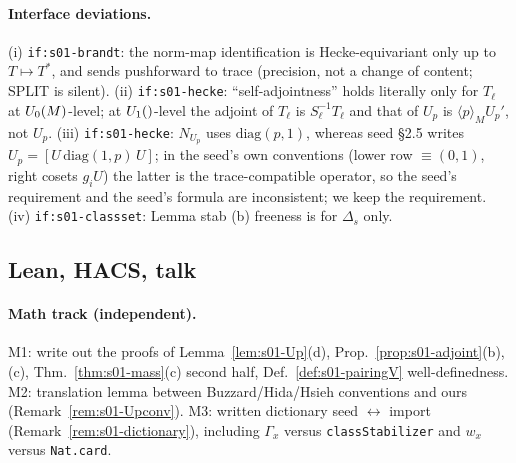 \paragraph{Interface deviations.}
(i) \texttt{if:s01-brandt}: the norm-map identification is Hecke-equivariant only up to $T\mapsto T^*$, and sends pushforward to
trace (precision, not a change of content; SPLIT is silent). (ii) \texttt{if:s01-hecke}: ``self-adjointness'' holds literally only for
$T_\ell$ at $U_0(M)$-level; at $U_1()$-level the adjoint of $T_\ell$ is $S_\ell^{-1}T_\ell$ and that of $U_p$ is
$\langle p\rangle_MU_p'$, not $U_p$. (iii) \texttt{if:s01-hecke}: $N_{U_p}$ uses $\mathrm{diag}(p,1)$, whereas seed \S2.5 writes
$U_p=[U\,\mathrm{diag}(1,p)\,U]$; in the seed's own conventions (lower row $\equiv(0,1)$, right cosets $g_iU$) the latter is the
trace-compatible operator, so the seed's requirement and the seed's formula are inconsistent; we keep the requirement.
(iv) \texttt{if:s01-classset}: Lemma stab (b) freeness is for $\Delta_s$ only.

\subsection{Lean, HACS, talk}
\paragraph{Math track (independent).}
M1: write out the proofs of Lemma~\ref{lem:s01-Up}(d), Prop.~\ref{prop:s01-adjoint}(b),(c), Thm.~\ref{thm:s01-mass}(c) second
half, Def.~\ref{def:s01-pairingV} well-definedness. M2: translation lemma between Buzzard/Hida/Hsieh conventions and ours
(Remark~\ref{rem:s01-Upconv}). M3: written dictionary seed $\leftrightarrow$ import (Remark~\ref{rem:s01-dictionary}),
including $\Gamma_x$ versus \texttt{classStabilizer} and $w_x$ versus \texttt{Nat.card}.

